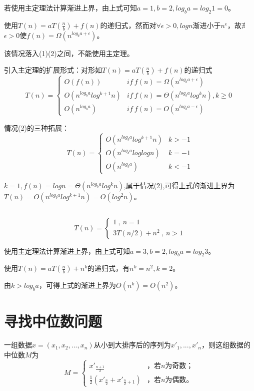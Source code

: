 \documentclass{article}
\begin{document}
若使用主定理法计算渐进上界，由上式可知$a=1,b=2,log_b a=log_{2}1=0$。

使用$T(n)=aT(\frac{n}{b})+f(n)$的递归式，然而对$\forall \epsilon>0,logn$渐进小于$n^{\epsilon}$，故$\nexists$$\epsilon>0$使$f(n)=\Omega(n^{log_b{a+\epsilon}})$。

该情况落入(1)(2)之间，不能使用主定理。

引入主定理的扩展形式：对形如$T(n)=aT(\frac{n}{b})+f(n)$的递归式
$$
T(n)=\begin{cases}
O(f(n))& if\ f(n)=\Omega(n^{log_b{a+\epsilon}})\\
O(n^{log_b{a}}log^{k+1}n)& if\ f(n)=\Theta(n^{log_b{a}}log^k n),k\geq 0\\
O(n^{log_b{a}})& if\ f(n)=O(n^{log_b{a-\epsilon}})
\end{cases}
$$

情况(2)的三种拓展：
$$
T(n)=\begin{cases}
O(n^{log_b{a}}log^{k+1}n)& k>-1\\
O(n^{log_b{a}}loglogn)& k=-1\\
O(n^{log_b{a}})& k<-1
\end{cases}
$$

$k=1,f(n)=logn=\Theta(n^{log_b{a}}log^k n)$,属于情况(2),可得上式的渐进上界为$T(n)=O(n^{log_b{a}}log^{k+1}n)=O(log^2{n})$。

\subsection{}

$$
T(n)=\left\{
\begin{array}{l}
1\ ,\ n=1\\
3T(n/2)+n^2\ ,\ n>1
\end{array}
\right.
$$

使用主定理法计算渐进上界，由上式可知$a=3,b=2,log_b a=log_{2}3$。

使用$T(n)=aT(\frac{n}{b})+n^k$的递归式，有$n^k=n^2,k=2$。

由$k>log_b a$，可得上式的渐进上界为$O(n^k)=O(n^2)$。



\section{寻找中位数问题}

一组数据$x=(x_1,x_2,...,x_n)$从小到大排序后的序列为$x'_1,...,x'_n$，则这组数据的中位数$M$为$$M=
\begin{cases}
x'_{\frac{n+1}{2}}& \text{，若$n$为奇数；}\\
\frac{1}{2}(x'_{\frac{n}{2}}+x'_{\frac{n}{2}+1})& \text{，若$n$为偶数。}
\end{cases}$$
\end{document}
